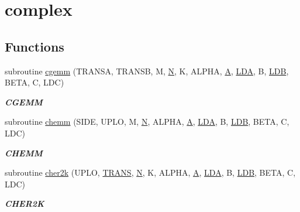 \hypertarget{group__complex__blas__level3}{}\section{complex}
\label{group__complex__blas__level3}
\subsection*{Functions}
\begin{DoxyCompactItemize}
\item 
subroutine \hyperlink{group__complex__blas__level3_gac4e11e8e8a4b0c802d2229b08da341f6}{cgemm} (T\+R\+A\+N\+S\+A, T\+R\+A\+N\+S\+B, M, \hyperlink{polmisc_8c_a0240ac851181b84ac374872dc5434ee4}{N}, K, A\+L\+P\+H\+A, \hyperlink{classA}{A}, \hyperlink{example__user_8c_ae946da542ce0db94dced19b2ecefd1aa}{L\+D\+A}, B, \hyperlink{example__user_8c_a50e90a7104df172b5a89a06c47fcca04}{L\+D\+B}, B\+E\+T\+A, C, L\+D\+C)
\begin{DoxyCompactList}\small\item\em {\bfseries C\+G\+E\+M\+M} \end{DoxyCompactList}\item 
subroutine \hyperlink{group__complex__blas__level3_gad2d1853a142397404eae974b6574ece3}{chemm} (S\+I\+D\+E, U\+P\+L\+O, M, \hyperlink{polmisc_8c_a0240ac851181b84ac374872dc5434ee4}{N}, A\+L\+P\+H\+A, \hyperlink{classA}{A}, \hyperlink{example__user_8c_ae946da542ce0db94dced19b2ecefd1aa}{L\+D\+A}, B, \hyperlink{example__user_8c_a50e90a7104df172b5a89a06c47fcca04}{L\+D\+B}, B\+E\+T\+A, C, L\+D\+C)
\begin{DoxyCompactList}\small\item\em {\bfseries C\+H\+E\+M\+M} \end{DoxyCompactList}\item 
subroutine \hyperlink{group__complex__blas__level3_gaf5266b622e0fbbd972cfc2df3061984f}{cher2k} (U\+P\+L\+O, \hyperlink{superlu__enum__consts_8h_a0c4e17b2d5cea33f9991ccc6a6678d62a1f61e3015bfe0f0c2c3fda4c5a0cdf58}{T\+R\+A\+N\+S}, \hyperlink{polmisc_8c_a0240ac851181b84ac374872dc5434ee4}{N}, K, A\+L\+P\+H\+A, \hyperlink{classA}{A}, \hyperlink{example__user_8c_ae946da542ce0db94dced19b2ecefd1aa}{L\+D\+A}, B, \hyperlink{example__user_8c_a50e90a7104df172b5a89a06c47fcca04}{L\+D\+B}, B\+E\+T\+A, C, L\+D\+C)
\begin{DoxyCompactList}\small\item\em {\bfseries C\+H\+E\+R2\+K} \end{DoxyCompactList}\item 

\end{DoxyCompactItemize}
